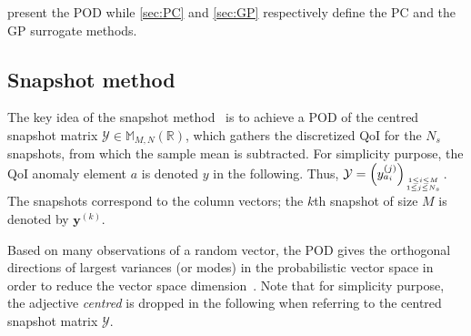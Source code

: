  present the POD while \cref{sec:PC} and \cref{sec:GP} respectively define the PC and the GP surrogate methods.


\subsection{Snapshot method}\label{sec:POD}

The key idea of the snapshot method~\citep{sirovich1987} is to achieve a POD of the centred snapshot matrix $\mathcal{Y} \in \mathbb{M}_{M,N}(\mathbb{R})$, which gathers the discretized QoI for the $N_{s}$ snapshots, from which the sample mean is subtracted. For simplicity purpose, the QoI anomaly element $a$ is denoted $y$ in the following. Thus, $\mathcal{Y} = \left(y_{a_i}^{(j)}\right)_{1\leq i \leq M \atop 1\leq j \leq N_{s}}$. The snapshots correspond to the column vectors; the $k$th snapshot of size $M$ is denoted by $\mathbf{y}^{(k)}$.

Based on many observations of a random vector, the POD gives the orthogonal directions of largest variances (or modes) in the probabilistic vector space in order to reduce the vector space dimension~\citep{chatterjee2000}. Note that for simplicity purpose, the adjective {\it centred} is dropped in the following when referring to the centred snapshot matrix $\mathcal{Y}$.

